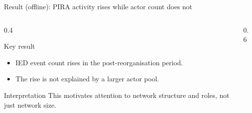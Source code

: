 \begin{frame}{Result (offline): PIRA activity rises while actor count does not}
  \small
  \begin{columns}[T,onlytextwidth]
    \begin{column}{0.4\textwidth}
      \begin{block}{Key result}
        \begin{itemize}
          \item IED event count rises in the post-reorganisation period.
          \item The rise is not explained by a larger actor pool.
        \end{itemize}
      \end{block}

      \begin{exampleblock}{Interpretation}
        This motivates attention to \alert{network structure and roles}, not just network size.
      \end{exampleblock}
    \end{column}

    \begin{column}{0.6\textwidth}
    \end{column}
  \end{columns}

\end{frame}

